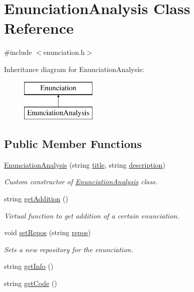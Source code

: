 \hypertarget{class_enunciation_analysis}{}\section{Enunciation\+Analysis Class Reference}
\label{class_enunciation_analysis}


{\ttfamily \#include $<$enunciation.\+h$>$}

Inheritance diagram for Enunciation\+Analysis\+:\begin{figure}[H]
\begin{center}
\leavevmode
\includegraphics[height=2.000000cm]{class_enunciation_analysis}
\end{center}
\end{figure}
\subsection*{Public Member Functions}
\begin{DoxyCompactItemize}
\item 
\hyperlink{class_enunciation_analysis_a1a6a72d187591dd38fbf92a37fee22dc}{Enunciation\+Analysis} (string \hyperlink{class_enunciation_a5e2accd01df4c81578dc8f7b83507167}{title}, string \hyperlink{class_enunciation_a0b30051b66bd07b227f6a227befb6c0c}{description})
\begin{DoxyCompactList}\small\item\em Custom constructor of \hyperlink{class_enunciation_analysis}{Enunciation\+Analysis} class. \end{DoxyCompactList}\item 
string \hyperlink{class_enunciation_analysis_a19fa90c811af4addfe77c4109520a8e1}{get\+Addition} ()
\begin{DoxyCompactList}\small\item\em Virtual function to get addition of a certain enunciation. \end{DoxyCompactList}\item 
void \hyperlink{class_enunciation_analysis_a5529f1e325fab32099b8845a2b624fa7}{set\+Repos} (string \hyperlink{class_enunciation_analysis_a3ceb48cf1cfe6594b853b52c9ce9aae4}{repos})
\begin{DoxyCompactList}\small\item\em Sets a new repository for the enunciation. \end{DoxyCompactList}\item 
string \hyperlink{class_enunciation_analysis_a6cc8894f92eecbb68a7ebeb4a8365896}{get\+Info} ()
\item 
string \hyperlink{class_enunciation_analysis_a8393cb5e4c7a096f09e1112dbc854cf8}{get\+Code} ()
\end{DoxyCompactItemize}
